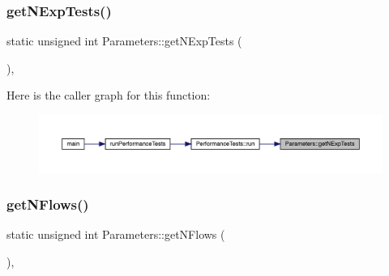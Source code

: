 \subsubsection{\texorpdfstring{getNExpTests()}{getNExpTests()}}
{\footnotesize\ttfamily static unsigned int Parameters\+::get\+N\+Exp\+Tests (\begin{DoxyParamCaption}{ }\end{DoxyParamCaption})\hspace{0.3cm}{\ttfamily [inline]}, {\ttfamily [static]}}

Here is the caller graph for this function\+:
\nopagebreak
\begin{figure}[H]
\begin{center}
\leavevmode
\includegraphics[width=350pt]{class_parameters_abd70d1df3ee0109789496fc9d21c2aef_icgraph}
\end{center}
\end{figure}
\mbox{\label{class_parameters_aae314edb18d426571ab7b6df60da70aa}} 
\subsubsection{\texorpdfstring{getNFlows()}{getNFlows()}}
{\footnotesize\ttfamily static unsigned int Parameters\+::get\+N\+Flows (\begin{DoxyParamCaption}{ }\end{DoxyParamCaption})\hspace{0.3cm}{\ttfamily [inline]}, {\ttfamily [static]}}

